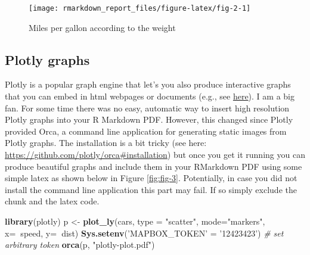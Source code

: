 \documentclass[
  12pt,
]{article}
\newenvironment{Shaded}{\begin{snugshade}}{\end{snugshade}}
\newcommand{\CommentTok}[1]{\textcolor[rgb]{0.56,0.35,0.01}{\textit{#1}}}
\newcommand{\DataTypeTok}[1]{\textcolor[rgb]{0.13,0.29,0.53}{#1}}
\newcommand{\KeywordTok}[1]{\textcolor[rgb]{0.13,0.29,0.53}{\textbf{#1}}}
\newcommand{\NormalTok}[1]{#1}
\newcommand{\OperatorTok}[1]{\textcolor[rgb]{0.81,0.36,0.00}{\textbf{#1}}}
\newcommand{\StringTok}[1]{\textcolor[rgb]{0.31,0.60,0.02}{#1}}
\begin{document}
\begin{figure}[H]

{\centering \texttt{[image: rmarkdown\_report\_files/figure-latex/fig-2-1]} 

}

\caption{Miles per gallon according to the weight}\label{fig:fig-2}
\end{figure}

\hypertarget{plotly-graphs}{%
\subsection{Plotly graphs}\label{plotly-graphs}}

Plotly is a popular graph engine that let's you also produce interactive graphs that you can embed in html webpages or documents (e.g., see \href{https://paulcbauer.shinyapps.io/visualizing-causal-scenarios/}{here}). I am a big fan. For some time there was no easy, automatic way to insert high resolution Plotly graphs into your R Markdown PDF. However, this changed since Plotly provided Orca, a command line application for generating static images from Plotly graphs. The installation is a bit tricky (see here: \url{https://github.com/plotly/orca\#installation}) but once you get it running you can produce beautiful graphs and include them in your RMarkdown PDF using some simple latex as shown below in Figure \ref{fig:fig-3}. Potentially, in case you did not install the command line application this part may fail. If so simply exclude the chunk and the latex code.

\begin{Shaded}
\begin{Highlighting}[]
\KeywordTok{library}\NormalTok{(plotly)}
\NormalTok{p <-}\StringTok{ }\KeywordTok{plot_ly}\NormalTok{(cars, }\DataTypeTok{type =} \StringTok{"scatter"}\NormalTok{, }\DataTypeTok{mode=}\StringTok{"markers"}\NormalTok{,}
        \DataTypeTok{x=}\OperatorTok{~}\NormalTok{speed, }
        \DataTypeTok{y=}\OperatorTok{~}\NormalTok{dist)}
\KeywordTok{Sys.setenv}\NormalTok{(}\StringTok{'MAPBOX_TOKEN'}\NormalTok{ =}\StringTok{ '12423423'}\NormalTok{) }\CommentTok{# set arbitrary token}
\KeywordTok{orca}\NormalTok{(p, }\StringTok{"plotly-plot.pdf"}\NormalTok{)}
\end{Highlighting}
\end{Shaded}
\end{document}
